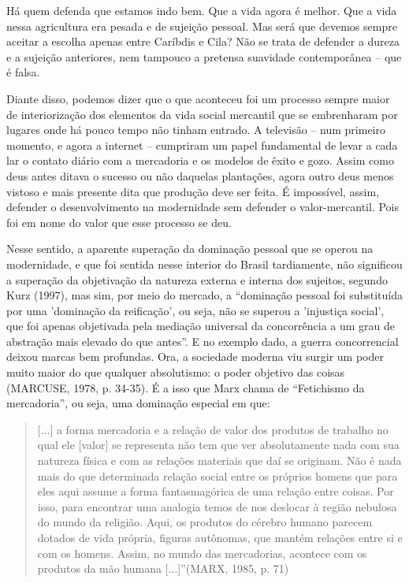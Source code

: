 Há quem defenda que estamos indo bem. Que a vida agora é melhor. Que a
vida nessa agricultura era pesada e de sujeição pessoal. Mas será que
devemos sempre aceitar a escolha apenas entre Caríbdis e Cila? Não se
trata de defender a dureza e a sujeição anteriores, nem tampouco a
pretensa suavidade contemporânea -- que é falsa.

Diante disso, podemos dizer que o que aconteceu foi um processo sempre
maior de interiorização dos elementos da vida social mercantil que se
embrenharam por lugares onde há pouco tempo não tinham entrado. A
televisão -- num primeiro momento, e agora a internet -- cumpriram um
papel fundamental de levar a cada lar o contato diário com a mercadoria
e os modelos de êxito e gozo. Assim como deus antes ditava o sucesso ou
não daquelas plantações, agora outro deus menos vistoso e mais presente
dita que produção deve ser feita. É impossível, assim, defender o
desenvolvimento na modernidade sem defender o valor-mercantil. Pois foi
em nome do valor que esse processo se deu.

Nesse sentido, a aparente superação da dominação pessoal que se operou
na modernidade, e que foi sentida nesse interior do Brasil tardiamente,
não significou a superação da objetivação da natureza externa e interna
dos sujeitos, segundo Kurz (1997), mas sim, por meio do mercado, a
``dominação pessoal foi substituída por uma 'dominação da reificação',
ou seja, não se superou a 'injustiça social', que foi apenas objetivada
pela mediação universal da concorrência a um grau de abstração mais
elevado do que antes''. E no exemplo dado, a guerra concorrencial deixou
marcas bem profundas. Ora, a sociedade moderna viu surgir um poder muito
maior do que qualquer absolutismo: o poder objetivo das coisas (MARCUSE,
1978, p. 34-35). É a isso que Marx chama de ``Fetichismo da
mercadoria'', ou seja, uma dominação especial em que:

\begin{quote}
{[}...{]} a forma mercadoria e a relação de valor dos produtos de
trabalho no qual ele {[}valor{]} se representa não tem que ver
absolutamente nada com sua natureza física e com as relações materiais
que daí se originam. Não é nada mais do que determinada relação social
entre os próprios homens que para eles aqui assume a forma
fantasmagórica de uma relação entre coisas. Por isso, para encontrar uma
analogia temos de nos deslocar à região nebulosa do mundo da religião.
Aqui, os produtos do cérebro humano parecem dotados de vida própria,
figuras autônomas, que mantém relações entre si e com os homens. Assim,
no mundo das mercadorias, acontece com os produtos da mão humana
{[}...{]}''(MARX, 1985, p. 71)
\end{quote}

